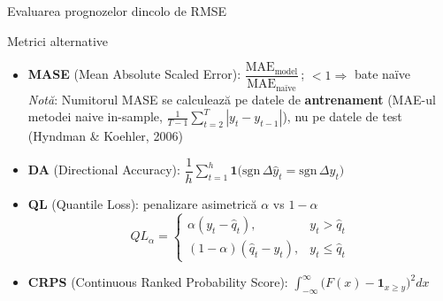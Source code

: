 \documentclass[9pt, aspectratio=169, t]{beamer}
\begin{document}
\begin{frame}{Evaluarea prognozelor dincolo de RMSE}
    {\small
    \begin{block}{Metrici alternative}
        \begin{itemize}\setlength{\itemsep}{4pt}
            \item \textbf{MASE} (Mean Absolute Scaled Error): $\dfrac{\text{MAE}_{\text{model}}}{\text{MAE}_{\text{naïve}}}$\,; \; $<1 \Rightarrow$ bate naïve\\[2pt]
            {\footnotesize\textit{Notă}: Numitorul MASE se calculează pe datele de \textbf{antrenament} (MAE-ul metodei naive in-sample, $\frac{1}{T-1}\sum_{t=2}^{T}|y_t - y_{t-1}|$), nu pe datele de test (Hyndman \& Koehler, 2006)}
            \item \textbf{DA} (Directional Accuracy): $\dfrac{1}{h}\sum_{t=1}^{h} \mathbf{1}\!\bigl(\text{sgn}\,\Delta\hat{y}_t = \text{sgn}\,\Delta y_t\bigr)$
            \item \textbf{QL} (Quantile Loss): penalizare asimetrică $\alpha$ vs $1\!-\!\alpha$
            \[
            QL_{\alpha} =
            \begin{cases}
            \alpha (y_t - \hat{q}_t), & y_t > \hat{q}_t \\
            (1-\alpha)(\hat{q}_t - y_t), & y_t \le \hat{q}_t
            \end{cases}
            \]
            \item \textbf{CRPS} (Continuous Ranked Probability Score): $\displaystyle\int_{-\infty}^{\infty}\!\bigl(F(x) - \mathbf{1}_{x \ge y}\bigr)^{2}dx$
        \end{itemize}
    \end{block}
    }
\end{frame}
\end{document}
